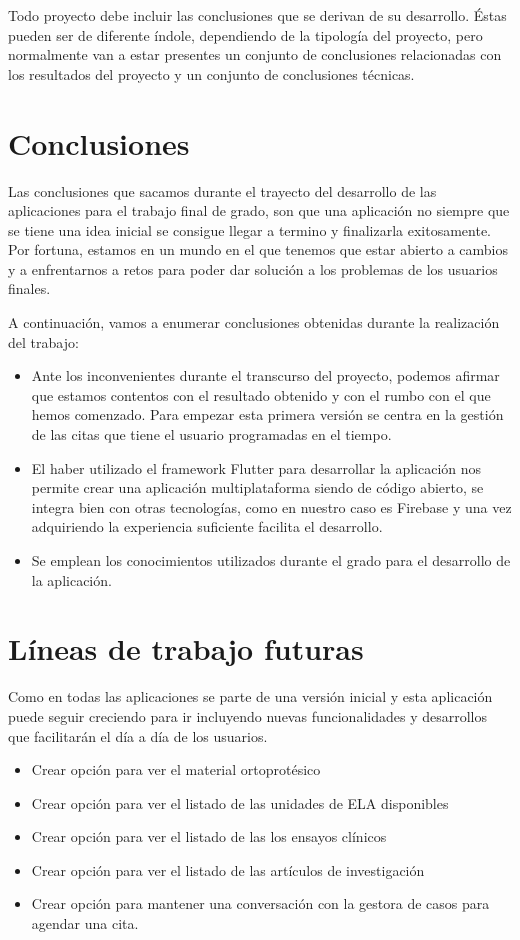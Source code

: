 
Todo proyecto debe incluir las conclusiones que se derivan de su desarrollo. Éstas pueden ser de diferente índole, dependiendo de la tipología del proyecto, pero normalmente van a estar presentes un conjunto de conclusiones relacionadas con los resultados del proyecto y un conjunto de conclusiones técnicas. 

\section{Conclusiones}
Las conclusiones que sacamos durante el trayecto del desarrollo de las aplicaciones para el trabajo final de grado, son que una aplicación no siempre que se tiene una idea inicial se consigue llegar a termino y finalizarla exitosamente. Por fortuna, estamos en un mundo en el que tenemos que estar abierto a cambios y a enfrentarnos a retos para poder dar solución a los problemas de los usuarios finales.

A continuación, vamos a enumerar conclusiones obtenidas durante la realización del trabajo:
\begin{itemize}
\item Ante los inconvenientes durante el transcurso del proyecto, podemos afirmar que estamos contentos con el resultado obtenido y con el rumbo con el que hemos comenzado. Para empezar esta primera versión se centra en la gestión de las citas que tiene el usuario programadas en el tiempo.
\item El haber utilizado el framework Flutter para desarrollar la aplicación nos permite crear una aplicación multiplataforma siendo de código abierto, se integra bien con otras tecnologías, como en nuestro caso es Firebase y una vez adquiriendo la experiencia suficiente facilita el desarrollo.
\item Se emplean los conocimientos utilizados durante el grado para el desarrollo de la aplicación.
\end{itemize}

\section{Líneas de trabajo futuras}
Como en todas las aplicaciones se parte de una versión inicial y esta aplicación puede seguir creciendo para ir incluyendo nuevas funcionalidades y desarrollos que facilitarán el día a día de los usuarios.
\begin{itemize}
\item Crear opción para ver el material ortoprotésico
\item Crear opción para ver el listado de las unidades de ELA disponibles
\item Crear opción para ver el listado de las los ensayos clínicos
\item Crear opción para ver el listado de las artículos de investigación
\item Crear opción para mantener una conversación con la gestora de casos para agendar una cita.
\end{itemize}
